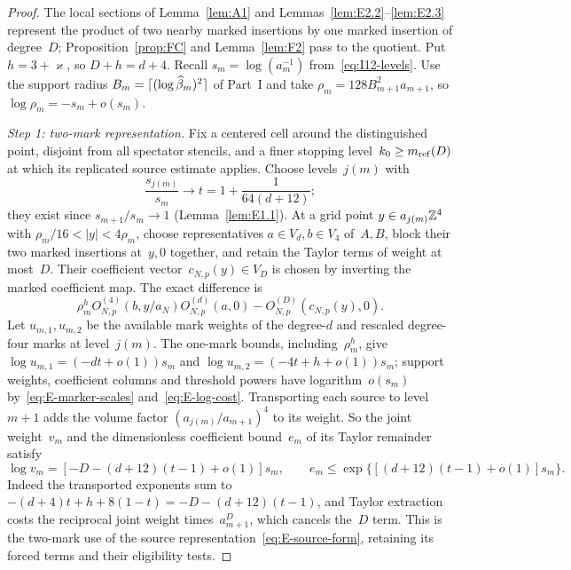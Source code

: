 \begin{proof}
The local sections of Lemma~\ref{lem:A1} and Lemmas~\ref{lem:E2.2}--\ref{lem:E2.3} represent the product of two nearby marked insertions by one marked insertion of degree~$D$; Proposition~\ref{prop:FC} and Lemma~\ref{lem:F2} pass to the quotient. Put $h=3+\varkappa$, so $D+h=d+4$. Recall $s_m=\log(a_m^{-1})$ from~\eqref{eq:I12-levels}. Use the support radius $B_m=\lceil(\log\widehat{\beta}_m)^2\rceil$ of Part~I and take $\rho_m=128B_{m+1}^2a_{m+1}$, so $\log\rho_m=-s_m+o(s_m)$.

\emph{Step 1: two-mark representation.} Fix a centered cell around the distinguished point, disjoint from all spectator stencils, and a finer stopping level~$k_0\ge m_{\mathrm{ref}}(D)$ at which its replicated source estimate applies. Choose levels~$j(m)$ with
\begin{equation*}
\frac{s_{j(m)}}{s_m}\longrightarrow t=1+\frac1{64(d+12)};
\end{equation*}
they exist since $s_{m+1}/s_m\to1$ (Lemma~\ref{lem:E1.1}). At a grid point $y\in a_{j(m)}\mathbb{Z}^4$ with $\rho_m/16<|y|<4\rho_m$, choose representatives $a\in V_d,b\in V_4$ of~$A,B$, block their two marked insertions at~$y,0$ together, and retain the Taylor terms of weight at most~$D$. Their coefficient vector~$c_{N,p}(y)\in V_D$ is chosen by inverting the marked coefficient map. The exact difference is
\begin{equation*}
\rho_m^h O_{N,p}^{(4)}(b,y/a_N)O_{N,p}^{(d)}(a,0)
 -O_{N,p}^{(D)}(c_{N,p}(y),0).
\end{equation*}
Let $u_{m,1},u_{m,2}$ be the available mark weights of the degree-$d$ and rescaled degree-four marks at level~$j(m)$. The one-mark bounds, including~$\rho_m^h$, give $\log u_{m,1}=(-dt+o(1))s_m$ and $\log u_{m,2}=(-4t+h+o(1))s_m$; support weights, coefficient columns and threshold powers have logarithm~$o(s_m)$ by~\eqref{eq:E-marker-scales} and~\eqref{eq:E-log-cost}. Transporting each source to level~$m+1$ adds the volume factor $(a_{j(m)}/a_{m+1})^4$ to its weight. So the joint weight~$v_m$ and the dimensionless coefficient bound~$e_m$ of its Taylor remainder satisfy
\begin{equation}\label{eq:G-annular-cost}
\log v_m=[-D-(d+12)(t-1)+o(1)]s_m,\qquad
e_m\le\exp\{[(d+12)(t-1)+o(1)]s_m\}.
\end{equation}
Indeed the transported exponents sum to $-(d+4)t+h+8(1-t)=-D-(d+12)(t-1)$, and Taylor extraction costs the reciprocal joint weight times~$a_{m+1}^D$, which cancels the~$D$ term. This is the two-mark use of the source representation~\eqref{eq:E-source-form}, retaining its forced terms and their eligibility tests.


\end{proof}
